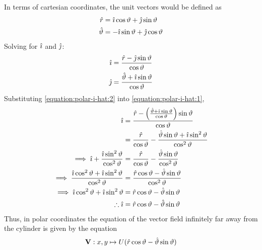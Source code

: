 In terms of cartesian coordinates, the unit vectors would be defined as
\begin{align*}
    \hat{r}&=\hat{\imath}\cos\vartheta+\hat{\jmath}\sin\vartheta\\
    \hat{\vartheta}&=-\hat{\imath}\sin\vartheta+\hat{\jmath}\cos\vartheta
\end{align*}
Solving for $\hat{\imath}$ and $\hat{\jmath}$:
\begin{align}
    \label{equation:polar-i-hat:1}\hat{\imath}&=\frac{\hat{r}-\hat{\jmath}\sin\vartheta}{\cos\vartheta}\\
    \label{equation:polar-i-hat:2}\hat{\jmath}&=\frac{\hat{\vartheta}+\hat{\imath}\sin\vartheta}{\cos\vartheta}
\end{align}
Substituting \eqref{equation:polar-i-hat:2} into \eqref{equation:polar-i-hat:1},
\begin{align*}
    \hat{\imath}&=\frac{\hat{r}-\left(\frac{\hat{\vartheta}+\hat{\imath}\sin\vartheta}{\cos\vartheta}\right)\sin\vartheta}{\cos\vartheta}\\
    &=\frac{\hat{r}}{\cos\vartheta}-\frac{\hat{\vartheta}\sin\vartheta+\hat{\imath}\sin^2\vartheta}{\cos^2\vartheta}\\
    \implies\hat{\imath}+\frac{\hat{\imath}\sin^2\vartheta}{\cos^2\vartheta}&=\frac{\hat{r}}{\cos\vartheta}-\frac{\hat{\vartheta}\sin\vartheta}{\cos^2\vartheta}\\
    \implies\frac{\hat{\imath}\cos^2\vartheta+\hat{\imath}\sin^2\vartheta}{\cos^2\vartheta}&=\frac{\hat{r}\cos\vartheta-\hat{\vartheta}\sin\vartheta}{\cos^2\vartheta}\\
    \implies\hat{\imath}\cos^2\vartheta+\hat{\imath}\sin^2\vartheta&=\hat{r}\cos\vartheta-\hat{\vartheta}\sin\vartheta\\
    \therefore\hat{\imath}&=\hat{r}\cos\vartheta-\hat{\vartheta}\sin\vartheta
\end{align*}
Thus, in polar coordinates the equation of the vector field infinitely far away from the cylinder is given by the equation
$$
    \mathbf{V}:x,y\mapsto U(\hat{r}\cos\vartheta-\hat{\vartheta}\sin\vartheta)
$$